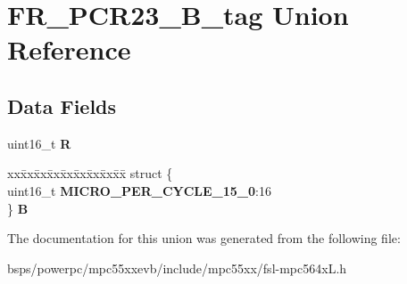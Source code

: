 \hypertarget{unionFR__PCR23__16B__tag}{}\section{F\+R\+\_\+\+P\+C\+R23\+\_\+B\+\_\+tag Union Reference}
\label{unionFR__PCR23__16B__tag}
\subsection*{Data Fields}
\begin{DoxyCompactItemize}
\item 
\mbox{\label{unionFR__PCR23__16B__tag_a506c1772d4eed9f351ef0f53b9253b23}} 
uint16\+\_\+t {\bfseries R}
\item 
\mbox{\label{unionFR__PCR23__16B__tag_aacd56d74ff5444d9dc41aece0001a75e}} 
\begin{tabbing}
xx\=xx\=xx\=xx\=xx\=xx\=xx\=xx\=xx\=\kill
struct \{\\
\>uint16\_t {\bfseries MICRO\_PER\_CYCLE\_15\_0}:16\\
\} {\bfseries B}\\

\end{tabbing}\end{DoxyCompactItemize}


The documentation for this union was generated from the following file\+:\begin{DoxyCompactItemize}
\item 
bsps/powerpc/mpc55xxevb/include/mpc55xx/fsl-\/mpc564x\+L.\+h\end{DoxyCompactItemize}
